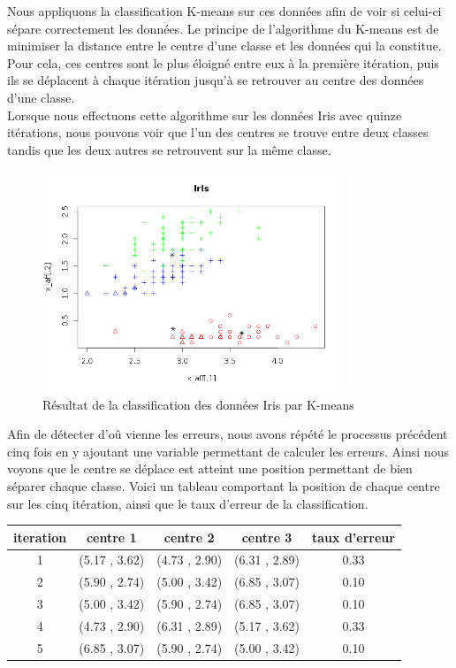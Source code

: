 \documentclass[a4paper,11pt]{article}
\begin{document}
  Nous appliquons la classification K-means sur ces données afin de voir si celui-ci sépare correctement les données.
  Le principe de l'algorithme du K-means est de minimiser la distance entre le centre d'une classe et les données
  qui la constitue. Pour cela, ces centres sont le plus éloigné entre eux à la première itération, puis ils se 
  déplacent à chaque itération jusqu'à se retrouver au centre des données d'une classe.\\
  
  Lorsque nous effectuons cette algorithme sur les données Iris avec quinze itérations, nous pouvons voir que l'un des centres se trouve 
  entre deux classes tandis que les deux autres se retrouvent sur la même classe.
  
  \begin{figure}[H]
    \center
    \includegraphics[width=9cm]{resultat/kmeans.png}
    \caption{Résultat de la classification des données Iris par K-means}
  \end{figure}
  
  Afin de détecter d'oû vienne les erreurs, nous avons répété le processus précédent cinq fois en y ajoutant
  une variable permettant de calculer les erreurs. Ainsi nous voyons que le centre se déplace est atteint une
  position permettant de bien séparer chaque classe. Voici un tableau comportant la position de chaque centre
  sur les cinq itération, ainsi que le taux d'erreur de la classification.\\
  
  \begin{center}
  \begin{tabular}{|c|c|c|c|c|}
    \hline
    iteration & centre 1 & centre 2 & centre 3 & taux d'erreur\\
    \hline
    1 & (5.17 , 3.62) & (4.73 , 2.90) & (6.31 , 2.89) & 0.33\\
    \hline
    2 & (5.90 , 2.74) & (5.00 , 3.42) & (6.85 , 3.07) & 0.10\\
    \hline
    3 & (5.00 , 3.42) & (5.90 , 2.74) & (6.85 , 3.07) & 0.10\\
    \hline
    4 & (4.73 , 2.90) & (6.31 , 2.89) & (5.17 , 3.62) & 0.33\\
    \hline
    5 & (6.85 , 3.07) & (5.90 , 2.74) & (5.00 , 3.42) & 0.10\\
    \hline
  \end{tabular}
  \end{center}
  
\end{document}
